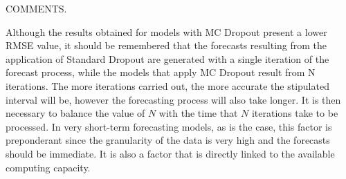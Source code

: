 COMMENTS.

Although the results obtained for models with MC Dropout present a lower \ac{RMSE} value, it should be remembered that the forecasts resulting from the application of Standard Dropout are generated with a single iteration of the forecast process, while the models that apply MC Dropout result from N iterations. The more iterations carried out, the more accurate the stipulated interval will be, however the forecasting process will also take longer. It is then necessary to balance the value of $N$ with the time that $N$ iterations take to be processed. In very short-term forecasting models, as is the case, this factor is preponderant since the granularity of the data is very high and the forecasts should be immediate. It is also a factor that is directly linked to the available computing capacity.


